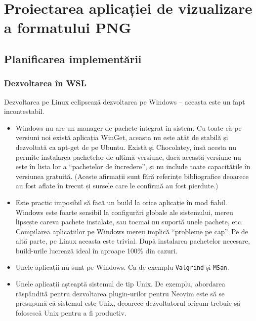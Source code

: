 \documentclass[a4paper,12pt]{report}
\begin{document}
\chapter{Proiectarea aplicației de vizualizare a formatului \acs{PNG}}\label{architecture_chapter_title}

\section{Planificarea implementării}

\subsection{Dezvoltarea în \acs{WSL}}

Dezvoltarea pe Linux eclipsează dezvoltarea pe Windows -- aceasta este un fapt incontestabil.
\begin{itemize}
    \item 
        Windows nu are un manager de pachete integrat în sistem.
        Cu toate că pe versiuni noi există aplicația WinGet, 
        aceasta nu este atât de stabilă și dezvoltată ca apt-get de pe Ubuntu.
        Există și Chocolatey, însă acesta nu permite instalarea pachetelor de ultimă versiune,
        dacă această versiune nu este în lista lor a ``pachetelor de încredere'',
        și nu include toate capacitățile în versiunea gratuită.
        (Aceste afirmații sunt fără referințe bibliografice deoarece 
        au fost aflate în trecut și sursele care le confirmă au fost pierdute.)

    \item
        Este practic imposibil să facă un build la orice aplicație în mod fiabil.
        Windows este foarte sensibil la configurări globale ale sistemului,
        mereu lipsește careva pachete instalate, sau tocmai nu suportă unele pachete, etc.
        Compilarea aplicațiilor pe Windows mereu implică ``probleme pe cap''.
        Pe de altă parte, pe Linux aceasta este trivial.
        După instalarea pachetelor necesare, build-urile lucrează ideal în aproape 100\% din cazuri.

    \item
        Unele aplicații nu sunt pe Windows.
        Ca de exemplu \texttt{Valgrind} și \texttt{MSan}.

    \item
        Unele aplicații așteaptă sistemul de tip Unix.
        De exemplu, abordarea răspândită pentru dezvoltarea plugin-urilor
        pentru Neovim este să se presupună că sistemul este Unix,
        deoarece dezvoltatorul oricum trebuie să folosescă Unix pentru a fi productiv.
\end{itemize}
\end{document}
